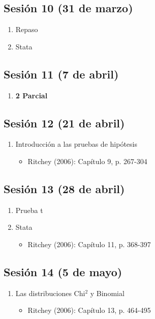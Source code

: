 \documentclass[letterpaper]{article}
\begin{document}
\subsection{Sesión 10 (31 de marzo)}

\begin{enumerate}
\item Repaso
\item Stata

\end{enumerate}

\subsection{Sesión 11 (7 de abril)}
\begin{enumerate}
\item	{\bf 2 Parcial} 


\end{enumerate}

\subsection{Sesión 12 (21 de abril)}
\begin{enumerate}
	\item Introducción a las pruebas de hipótesis
	\begin{itemize}
		\item Ritchey (2006): Capítulo 9, p.
		267-304
	\end{itemize}


\end{enumerate}

\subsection{Sesión 13 (28 de abril)}
\begin{enumerate}
		\item Prueba t
		\item Stata
		\begin{itemize}
			\item Ritchey (2006):
			Capítulo 11, p.
			368-397
		\end{itemize}

\end{enumerate}

\subsection{Sesión 14 (5 de mayo)}
\begin{enumerate}
	\item Las distribuciones Chi$^2$ y Binomial	
	\begin{itemize}
		\item Ritchey (2006):
		Capítulo 13, p.
		464-495
	\end{itemize}

\end{enumerate}
\end{document}
